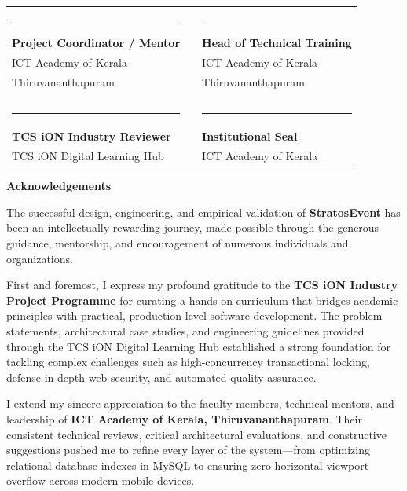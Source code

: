 \documentclass[11pt,a4paper]{report}
\begin{document}
\noindent
\begin{tabularx}{\textwidth}{p{}Xp{}}
  \rule{0.42\textwidth}{0.4pt} & & \rule{0.42\textwidth}{0.4pt} \\
  \textbf{Project Coordinator / Mentor} & & \textbf{Head of Technical Training} \\
  ICT Academy of Kerala & & ICT Academy of Kerala \\
  Thiruvananthapuram & & Thiruvananthapuram \\
  \\
  \\
  \rule{0.42\textwidth}{0.4pt} & & \rule{0.42\textwidth}{0.4pt} \\
  \textbf{TCS iON Industry Reviewer} & & \textbf{Institutional Seal} \\
  TCS iON Digital Learning Hub & & ICT Academy of Kerala
\end{tabularx}

\newpage
\thispagestyle{plain}

\vspace*{0.3in}

\begin{center}
  {\color{TitleBlue}\bfseries\fontsize{18}{22}\selectfont Acknowledgements\par}
\end{center}

\vspace{0.3in}

\noindent
The successful design, engineering, and empirical validation of \textbf{StratosEvent} has been an intellectually rewarding journey, made possible through the generous guidance, mentorship, and encouragement of numerous individuals and organizations.

\vspace{0.18in}
\noindent
First and foremost, I express my profound gratitude to the \textbf{TCS iON Industry Project Programme} for curating a hands-on curriculum that bridges academic principles with practical, production-level software development. The problem statements, architectural case studies, and engineering guidelines provided through the TCS iON Digital Learning Hub established a strong foundation for tackling complex challenges such as high-concurrency transactional locking, defense-in-depth web security, and automated quality assurance.

\vspace{0.18in}
\noindent
I extend my sincere appreciation to the faculty members, technical mentors, and leadership of \textbf{ICT Academy of Kerala, Thiruvananthapuram}. Their consistent technical reviews, critical architectural evaluations, and constructive suggestions pushed me to refine every layer of the system---from optimizing relational database indexes in MySQL to ensuring zero horizontal viewport overflow across modern mobile devices.
\end{document}
